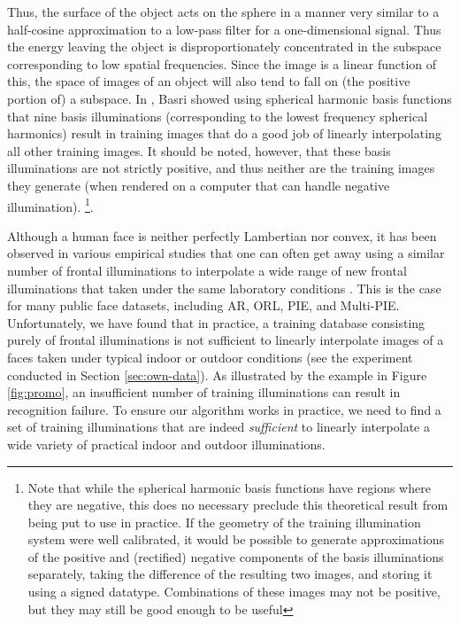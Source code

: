 Thus, the surface of the object acts on the sphere in a manner very similar to
a half-cosine approximation to a low-pass filter for a one-dimensional signal.
Thus the energy leaving the object is disproportionately concentrated in the
subspace corresponding to low spatial frequencies.  Since the image is a linear
function of this, the space of images of an object will also tend to fall on
(the positive portion of) a subspace.   In \cite{Basri2003-PAMI}, Basri showed
using spherical harmonic basis functions that nine basis illuminations
(corresponding to the lowest frequency spherical harmonics) result in training
images that do a good job of linearly interpolating all other training images.
It should be noted, however, that these basis illuminations are not strictly
positive, and thus neither are the training images they generate (when rendered
on a computer that can handle negative illumination).  \footnote{Note that
while the spherical harmonic basis functions have regions where they are
negative, this does no necessary preclude this theoretical result from being
put to use in practice.  If the geometry of the training illumination system
were well calibrated, it would be possible to generate approximations of the
positive and (rectified) negative components of the basis illuminations
separately, taking the difference of the resulting two images, and storing it
using a signed datatype.  Combinations of these images may not be positive, but
they may still be good enough to be useful}.

Although a human face is neither perfectly Lambertian nor convex, it has been
observed in various empirical studies that one can often get away using a
similar number of frontal illuminations to interpolate a wide range of new
frontal illuminations that taken under the same laboratory conditions
\cite{Georghiades2001-PAMI}. This is the case for many public face datasets,
including AR, ORL, PIE, and Multi-PIE.  Unfortunately, we have found that in
practice, a training database consisting purely of frontal illuminations is not
sufficient to linearly interpolate images of a faces taken under typical indoor
or outdoor conditions (see the experiment conducted in Section
\ref{sec:own-data}). As illustrated by the example in Figure \ref{fig:promo},
an insufficient number of training illuminations can result in recognition
failure.  To ensure our algorithm works in practice, we need to find a set of
training illuminations that are indeed {\em sufficient} to linearly interpolate
a wide variety of practical indoor and outdoor illuminations.

